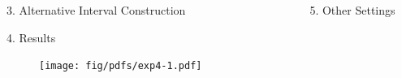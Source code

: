 \documentclass[final]{beamer}
\newlength{\sepwidth}
\newlength{\colwidth}
\newcommand{\separatorcolumn}{\begin{column}{\sepwidth}\end{column}}
\begin{document}
\begin{frame}[fragile]
\begin{columns}[t]
\begin{column}{\colwidth}
\begin{block}{3. Alternative Interval Construction}

  
  \end{block}

  \vspace{-1em}

  \begin{block}{4. Results}

    \begin{figure}
      \centering
      \texttt{[image: fig/pdfs/exp4-1.pdf]}
    \end{figure}

  \end{block}

\end{column}

\separatorcolumn

\begin{column}{\colwidth}

  \begin{exampleblock}{5. Other Settings}


\end{exampleblock}
\end{column}
\end{columns}
\end{frame}
\end{document}
